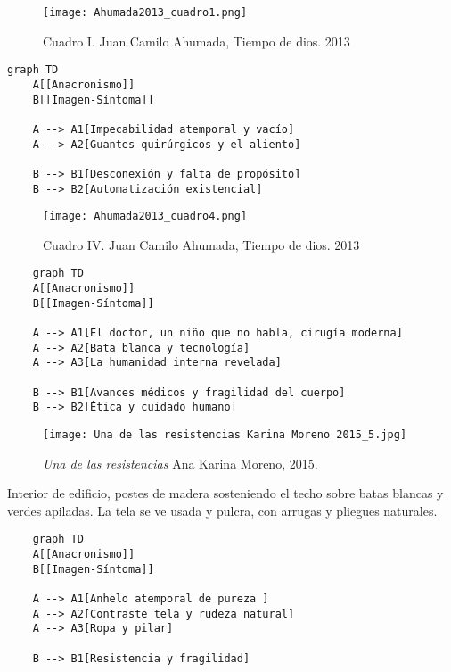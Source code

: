 \clearpage
\begin{figure}[h!]
    \centering
    \texttt{[image: Ahumada2013\_cuadro1.png]}
    \caption{Cuadro I. Juan Camilo Ahumada, Tiempo de dios. 2013}
    \label{fig:Ahumada2013_cuadro1}
\end{figure}

\parencite[p. 10]{Ahumada2013}

\small
\begin{verbatim}
graph TD
    A[[Anacronismo]]
    B[[Imagen-Síntoma]]
    
    A --> A1[Impecabilidad atemporal y vacío]
    A --> A2[Guantes quirúrgicos y el aliento]

    B --> B1[Desconexión y falta de propósito]
    B --> B2[Automatización existencial]

\end{verbatim}
\normalsize

\clearpage
\begin{figure}[h!]
    \centering
    \texttt{[image: Ahumada2013\_cuadro4.png]}
    \caption{Cuadro IV. Juan Camilo Ahumada, Tiempo de dios. 2013}
    \label{fig:Ahumada2013_cuadro4}
\end{figure}

\parencite[p. 12]{Ahumada2013}

\small
\begin{verbatim}
    graph TD
    A[[Anacronismo]]
    B[[Imagen-Síntoma]]
    
    A --> A1[El doctor, un niño que no habla, cirugía moderna]
    A --> A2[Bata blanca y tecnología]
    A --> A3[La humanidad interna revelada]
    
    B --> B1[Avances médicos y fragilidad del cuerpo]
    B --> B2[Ética y cuidado humano]

\end{verbatim}
\normalsize


\clearpage
\begin{figure}[h!]
    \centering
    \texttt{[image: Una de las resistencias Karina Moreno 2015\_5.jpg]}
    \caption{\textit{Una de las resistencias} Ana Karina Moreno, 2015.}
    \label{fig:KarinaMoreno2015}
\end{figure}

Interior de edificio, postes de madera sosteniendo el techo sobre batas blancas y verdes apiladas. La tela se ve usada y pulcra, con arrugas y pliegues naturales.

\small
\begin{verbatim}
    graph TD
    A[[Anacronismo]]
    B[[Imagen-Síntoma]]
    
    A --> A1[Anhelo atemporal de pureza ]
    A --> A2[Contraste tela y rudeza natural]
    A --> A3[Ropa y pilar]

    B --> B1[Resistencia y fragilidad]

\end{verbatim}
\normalsize


